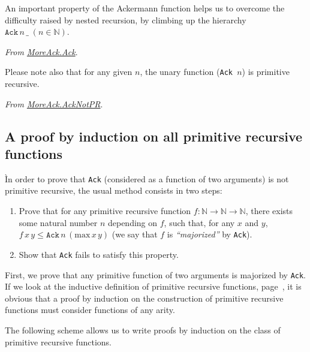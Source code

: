 An important property of the Ackermann function helps us 
to overcome the difficulty raised by nested recursion, by climbing up the hierarchy $\texttt{Ack}\,n\,\_\;(n\in\mathbb{N})$.


\noindent
\emph{From \href{../theories/html/hydras.MoreAck.Ack.html}{MoreAck.Ack}}.





Please note also that for any given $n$, the unary function
(\texttt{Ack\,$n$}) is primitive recursive.

\vspace{4pt}

\noindent

\emph{From \href{../theories/html/hydras.MoreAck.AckNotPR.html}{MoreAck.AckNotPR}}.







\subsection{A proof by induction on all primitive recursive functions}

Ìn order to prove that \texttt{Ack} (considered as a function of two arguments) is not primitive recursive, the usual method consists in two steps:


\begin{enumerate}
\item Prove that for any primitive recursive function $f:\mathbb{N}\rightarrow\mathbb{N}\rightarrow\mathbb{N}$, there exists some natural number $n$ depending on $f$, such that, for any $x$ and $y$, 
$f\,x\,y \leq \texttt{Ack}\,n\,(\textrm{max}\,x\,y)$ (we say that $f$ is \emph{``majorized''}  by \texttt{Ack}).
\item Show that \texttt{Ack} fails to satisfy this property.
\end{enumerate}

First, we prove that any primitive function of two arguments is majorized by \texttt{Ack}.
If we look at the inductive definition of primitive recursive functions, page~\pageref{def:Primrec}, it is obvious that a proof by induction on the construction of primitive recursive functions must consider functions of any arity.

The following scheme allows us to write proofs by induction on the class of primitive recursive functions. 


